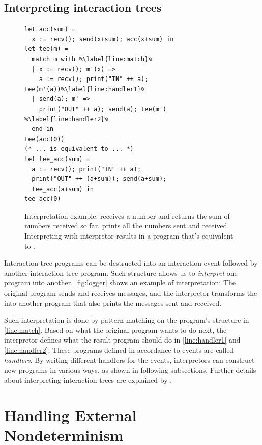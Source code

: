 \subsection{Interpreting interaction trees}

\begin{figure}
  \begin{lstlisting}[style=customcoq,numbers=right,escapechar=\%]
let acc(sum) =
  x := recv(); send(x+sum); acc(x+sum) in
let tee(m) =
  match m with %\label{line:match}%
  | x := recv(); m'(x) =>
    a := recv(); print("IN" ++ a); tee(m'(a))%\label{line:handler1}%
  | send(a); m' =>
    print("OUT" ++ a); send(a); tee(m') %\label{line:handler2}%
  end in
tee(acc(0))
(* ... is equivalent to ... *)
let tee_acc(sum) =
  a := recv(); print("IN" ++ a);
  print("OUT" ++ (a+sum)); send(a+sum);
  tee_acc(a+sum) in
tee_acc(0)
  \end{lstlisting}
  \caption[Interpreting ITree programs.]{Interpretation example.   receives a number and returns the
    sum of numbers received so far.   prints all the numbers sent and
    received.  Interpreting  with interpretor  results in a
    program that's equivalent to .}
  \label{fig:logger}
\end{figure}

Interaction tree programs can be destructed into an interaction event followed
by another interaction tree program.  Such structure allows us to {\em
  interpret} one program into another.  \autoref{fig:logger} shows an example of
interpretation: The original  program sends and receives messages, and
the  interpretor transforms the  into another program that
also prints the messages sent and received.

Such interpretation is done by pattern matching on the program's structure in
\autoref{line:match}.  Based on what the original program wants to do next, the
interpretor defines what the result program should do in \autoref{line:handler1}
and \autoref{line:handler2}.  These programs defined in accordance to events are
called {\em handlers}.  By writing different handlers for the events,
interpretors can construct new programs in various ways, as shown in following
subsections.  Further details about interpreting interaction trees are explained
by \textcite{itree}.

\section{Handling External Nondeterminism}
\label{sec:external-nondet}
